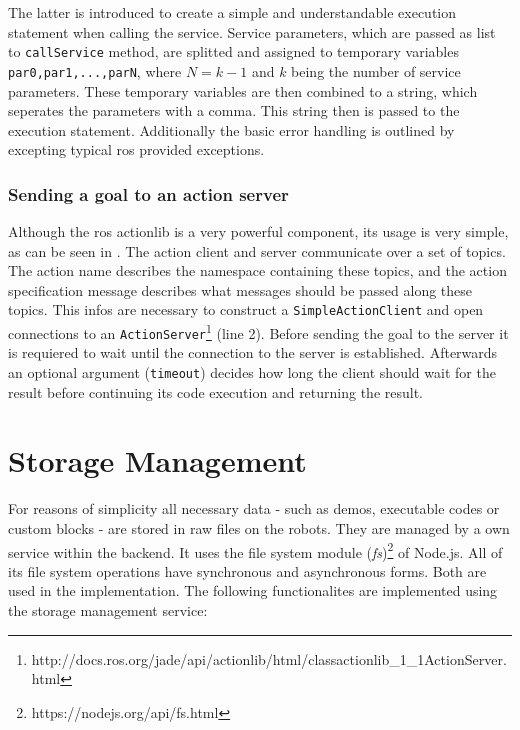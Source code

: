The latter is introduced to create a simple and understandable execution statement when calling the service. Service parameters, which are passed as list to \lstinline!callService! method, are splitted and assigned to temporary variables \lstinline!par0,par1,...,parN!, where $N=k-1$ and $k$ being the number of service parameters. These temporary variables are then combined to a string, which seperates the parameters with a comma. This string then is passed to the execution statement. Additionally the basic error handling is outlined by excepting typical \gls{ros} provided exceptions.

\begin{figure}[ht]
	
\end{figure}

\subsubsection{Sending a goal to an action server}
Although the \gls{ros} actionlib is a very powerful component, its usage is very simple, as can be seen in . The action client and server communicate over a set of topics. The action name describes the namespace containing these topics, and the action specification message describes what messages should be passed along these topics. This infos are necessary to construct a \lstinline!SimpleActionClient! and open connections to an \lstinline!ActionServer!\footnote{http://docs.ros.org/jade/api/actionlib/html/classactionlib\_1\_1ActionServer.html} (line 2). Before sending the goal to the server it is requiered to wait until the connection to the server is established. Afterwards an optional argument (\lstinline!timeout!) decides how long the client should wait for the result before continuing its code execution and returning the result.


\begin{figure}[htbp]
	
\end{figure}

\section{Storage Management}
For reasons of simplicity all necessary data - such as demos, executable codes or custom blocks - are stored in raw files on the robots. They are managed by a own service within the backend. It uses the file system module (\textit{fs})\footnote{https://nodejs.org/api/fs.html} of Node.js. All of its file system operations have synchronous and asynchronous forms. Both are used in the implementation. The following functionalites are implemented using the storage management service:

